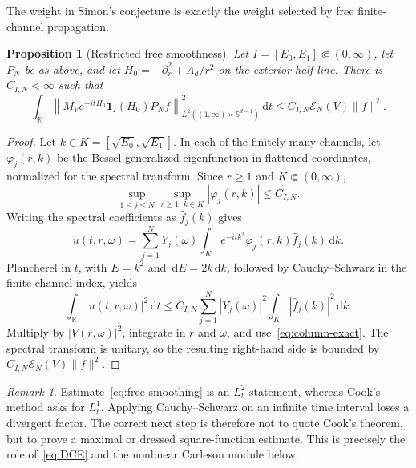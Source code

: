 \documentclass[11pt]{article}
\newcommand{\R}{\mathbb R}
\newcommand{\Sd}{\mathbb S^{d-1}}
\newcommand{\cE}{\mathcal E}
\newcommand{\dd}{\,\mathrm d}
\newtheorem{proposition}[theorem]{Proposition}
\theoremstyle{definition}
\theoremstyle{remark}
\newtheorem{remark}[theorem]{Remark}
\begin{document}
The weight in Simon's conjecture is exactly the weight selected by free finite-channel propagation.

\begin{proposition}[Restricted free smoothness]\label{prop:free-smoothing}
Let $I=[E_0,E_1]\Subset(0,\infty)$, let $P_N$ be as above, and let $H_0=-\partial_r^2+A_d/r^2$ on the exterior half-line.  There is $C_{I,N}<\infty$ such that
\begin{equation}
 \int_{\R}\left\|M_Ve^{-itH_0}\mathbf1_I(H_0)P_Nf\right\|_{L^2((1,\infty)\times\Sd)}^2\dd t
 \leq C_{I,N}\cE_N(V)\|f\|^2.
 \label{eq:free-smoothing}
\end{equation}
\end{proposition}

\begin{proof}
Let $k\in K=[\sqrt{E_0},\sqrt{E_1}]$.  In each of the finitely many channels, let $\varphi_j(r,k)$ be the Bessel generalized eigenfunction in flattened coordinates, normalized for the spectral transform.  Since $r\geq1$ and $K\Subset(0,\infty)$,
\begin{equation}
 \sup_{1\leq j\leq N}\sup_{r\geq1,\,k\in K}|\varphi_j(r,k)|\leq C_{I,N}.
 \label{eq:bessel-bound}
\end{equation}
Writing the spectral coefficients as $\widehat f_j(k)$ gives
\begin{equation}
 u(t,r,\omega)
 =\sum_{j=1}^NY_j(\omega)
   \int_K e^{-itk^2}\varphi_j(r,k)\widehat f_j(k)\dd k.
 \label{eq:free-expansion}
\end{equation}
Plancherel in $t$, with $E=k^2$ and $\dd E=2k\dd k$, followed by Cauchy--Schwarz in the finite channel index, yields
\begin{equation}
 \int_{\R}|u(t,r,\omega)|^2\dd t
 \leq C_{I,N}\sum_{j=1}^N|Y_j(\omega)|^2
 \int_K|\widehat f_j(k)|^2\dd k.
 \label{eq:pointwise-time}
\end{equation}
Multiply by $|V(r,\omega)|^2$, integrate in $r$ and $\omega$, and use~\eqref{eq:column-exact}.  The spectral transform is unitary, so the resulting right-hand side is bounded by $C_{I,N}\cE_N(V)\|f\|^2$.
\end{proof}

\begin{remark}
Estimate~\eqref{eq:free-smoothing} is an $L_t^2$ statement, whereas Cook's method asks for $L_t^1$.  Applying Cauchy--Schwarz on an infinite time interval loses a divergent factor.  The correct next step is therefore not to quote Cook's theorem, but to prove a maximal or dressed square-function estimate.  This is precisely the role of~\eqref{eq:DCE} and the nonlinear Carleson module below.
\end{remark}
\end{document}
